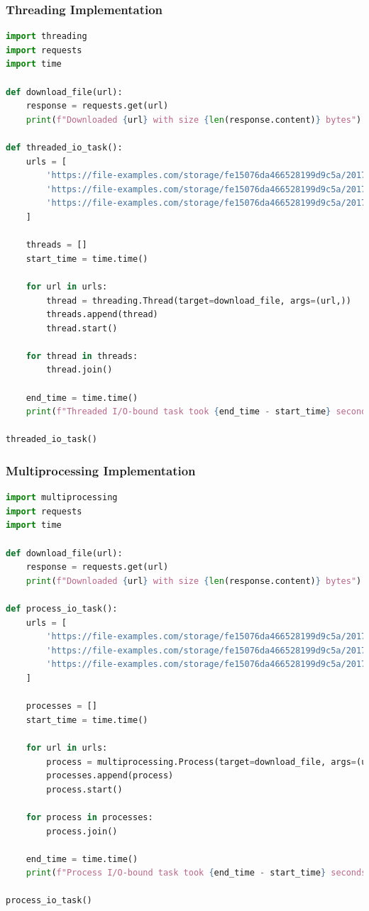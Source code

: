 \documentclass[onecolumn]{article}
\begin{document}
\subsubsection{Threading Implementation}
\begin{lstlisting}[language=Python, caption=Threaded I/O-bound Task]
import threading
import requests
import time

def download_file(url):
    response = requests.get(url)
    print(f"Downloaded {url} with size {len(response.content)} bytes")

def threaded_io_task():
    urls = [
        'https://file-examples.com/storage/fe15076da466528199d9c5a/2017/10/file_example_JPG_500kB.jpg',
        'https://file-examples.com/storage/fe15076da466528199d9c5a/2017/10/file_example_JPG_1MB.jpg',
        'https://file-examples.com/storage/fe15076da466528199d9c5a/2017/10/file_example_JPG_2500kB.jpg'
    ]

    threads = []
    start_time = time.time()

    for url in urls:
        thread = threading.Thread(target=download_file, args=(url,))
        threads.append(thread)
        thread.start()

    for thread in threads:
        thread.join()

    end_time = time.time()
    print(f"Threaded I/O-bound task took {end_time - start_time} seconds")

threaded_io_task()
\end{lstlisting}

\subsubsection{Multiprocessing Implementation}
\begin{lstlisting}[language=Python, caption=Process I/O-bound Task]
import multiprocessing
import requests
import time

def download_file(url):
    response = requests.get(url)
    print(f"Downloaded {url} with size {len(response.content)} bytes")

def process_io_task():
    urls = [
        'https://file-examples.com/storage/fe15076da466528199d9c5a/2017/10/file_example_JPG_500kB.jpg',
        'https://file-examples.com/storage/fe15076da466528199d9c5a/2017/10/file_example_JPG_1MB.jpg',
        'https://file-examples.com/storage/fe15076da466528199d9c5a/2017/10/file_example_JPG_2500kB.jpg'
    ]

    processes = []
    start_time = time.time()

    for url in urls:
        process = multiprocessing.Process(target=download_file, args=(url,))
        processes.append(process)
        process.start()

    for process in processes:
        process.join()

    end_time = time.time()
    print(f"Process I/O-bound task took {end_time - start_time} seconds")

process_io_task()
\end{lstlisting}
\end{document}
